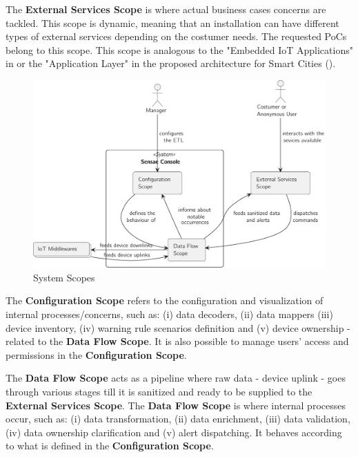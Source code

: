 The \textbf{External Services Scope} is where actual business cases concerns are tackled. This scope is dynamic, meaning that an installation can have different types of external services depending on the costumer needs. The requested \gls{PoC}s belong to this scope. This scope is analogous to the "Embedded IoT Applications" in  or the "Application Layer" in the proposed architecture for Smart Cities ().

\begin{figure}[H]
   \centering
   \includegraphics[page=1,width=\columnwidth]{assets/diagrams/design/scopes.pdf}
   \caption[System Scopes]{System Scopes}
   \label{fig:design:system_scopes:scopes}
\end{figure}

The \textbf{Configuration Scope} refers to the configuration and visualization of internal processes/concerns, such as: (i) data decoders, (ii) data mappers (iii) device inventory, (iv) warning rule scenarios definition and (v) device ownership - related to the \textbf{Data Flow Scope}. It is also possible to manage users' access and permissions in the \textbf{Configuration Scope}.

The \textbf{Data Flow Scope} acts as a pipeline where raw data - device uplink - goes through various stages till it is sanitized and ready to be supplied to the \textbf{External Services Scope}. The \textbf{Data Flow Scope} is where internal processes occur, such as: (i) data transformation, (ii) data enrichment, (iii) data validation, (iv) data ownership clarification and (v) alert dispatching. It behaves according to what is defined in the \textbf{Configuration Scope}.

